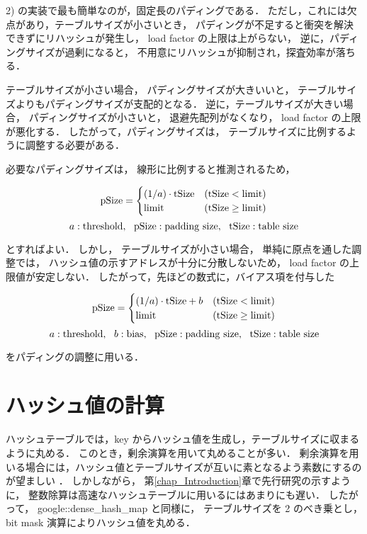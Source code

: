 2) の実装で最も簡単なのが，固定長のパディングである．
ただし，これには欠点があり，テーブルサイズが小さいとき，
パディングが不足すると衝突を解決できずにリハッシュが発生し，
load factor の上限は上がらない，
逆に，パディングサイズが過剰になると，
不用意にリハッシュが抑制され，探査効率が落ちる．

テーブルサイズが小さい場合，
パディングサイズが大きいいと，
テーブルサイズよりもパディングサイズが支配的となる．
逆に，テーブルサイズが大きい場合，
パディングサイズが小さいと，
退避先配列がなくなり，
load factor の上限が悪化する．
したがって，パディングサイズは，
テーブルサイズに比例するように調整する必要がある．

必要なパディングサイズは，
線形に比例すると推測されるため，

\[
  {\rm pSize} = \begin{cases}
    (1/a) \cdot {\rm tSize} & ({\rm tSize}<{\rm limit}) \\
    {\rm limit}    & ({\rm tSize}\geq{\rm limit})
  \end{cases}
\]
\[
  a: {\rm threshold}, \ \ 
  {\rm pSize}: {\rm padding \ size}, \ \ 
  {\rm tSize: table \ size}
\]

とすればよい．
しかし，
テーブルサイズが小さい場合，
単純に原点を通した調整では，
ハッシュ値の示すアドレスが十分に分散しないため，
load factor の上限値が安定しない．
したがって，先ほどの数式に，バイアス項を付与した

\[
  {\rm pSize} = \begin{cases}
    (1/a) \cdot {\rm tSize} + b & ({\rm tSize}<{\rm limit}) \\
    {\rm limit}    & ({\rm tSize}\geq{\rm limit})
  \end{cases}
\]
\[
  a: {\rm threshold}, \ \ 
  b: {\rm bias}, \ \ 
  {\rm pSize}: {\rm padding \ size}, \ \ 
  {\rm tSize}: {\rm table \ size}
\]

をパディングの調整に用いる．

\section{ハッシュ値の計算}

ハッシュテーブルでは，key からハッシュ値を生成し，テーブルサイズに収まるように丸める．
このとき，剰余演算を用いて丸めることが多い．
剰余演算を用いる場合には，ハッシュ値とテーブルサイズが互いに素となるよう素数にするのが望ましい \citep{石畑1989}．
しかしながら，
第\ref{chap_Introduction}章で先行研究の示すように，
整数除算は高速なハッシュテーブルに用いるにはあまりにも遅い．
したがって，
google::dense\_hash\_map と同様に，
テーブルサイズを 2 のべき乗とし，
bit mask 演算によりハッシュ値を丸める．


